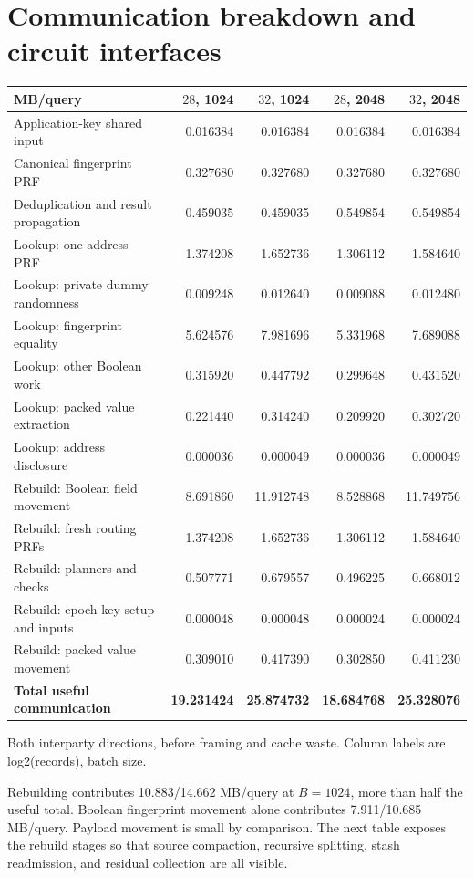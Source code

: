 \documentclass[11pt]{article}
\begin{document}
\section{Communication breakdown and circuit interfaces}
\begin{center}\footnotesize
\begin{tabular}{lrrrr}\toprule
MB/query & $28$, 1024 & $32$, 1024 & $28$, 2048 & $32$, 2048\\\midrule
Application-key shared input & 0.016384 & 0.016384 & 0.016384 & 0.016384\\
Canonical fingerprint PRF & 0.327680 & 0.327680 & 0.327680 & 0.327680\\
Deduplication and result propagation & 0.459035 & 0.459035 & 0.549854 & 0.549854\\
Lookup: one address PRF & 1.374208 & 1.652736 & 1.306112 & 1.584640\\
Lookup: private dummy randomness & 0.009248 & 0.012640 & 0.009088 & 0.012480\\
Lookup: fingerprint equality & 5.624576 & 7.981696 & 5.331968 & 7.689088\\
Lookup: other Boolean work & 0.315920 & 0.447792 & 0.299648 & 0.431520\\
Lookup: packed value extraction & 0.221440 & 0.314240 & 0.209920 & 0.302720\\
Lookup: address disclosure & 0.000036 & 0.000049 & 0.000036 & 0.000049\\
Rebuild: Boolean field movement & 8.691860 & 11.912748 & 8.528868 & 11.749756\\
Rebuild: fresh routing PRFs & 1.374208 & 1.652736 & 1.306112 & 1.584640\\
Rebuild: planners and checks & 0.507771 & 0.679557 & 0.496225 & 0.668012\\
Rebuild: epoch-key setup and inputs & 0.000048 & 0.000048 & 0.000024 & 0.000024\\
Rebuild: packed value movement & 0.309010 & 0.417390 & 0.302850 & 0.411230\\
\textbf{Total useful communication} & \textbf{19.231424} & \textbf{25.874732} & \textbf{18.684768} & \textbf{25.328076}\\
\bottomrule\end{tabular}\end{center}
{\footnotesize Both interparty directions, before framing and cache waste. Column labels are log2(records), batch size.\par}

Rebuilding contributes 10.883/14.662 MB/query at $B=1024$, more than half
the useful total. Boolean fingerprint movement alone contributes
7.911/10.685 MB/query. Payload movement is small by comparison. The next
table exposes the rebuild stages so that source compaction, recursive
splitting, stash readmission, and residual collection are all visible.
\end{document}
